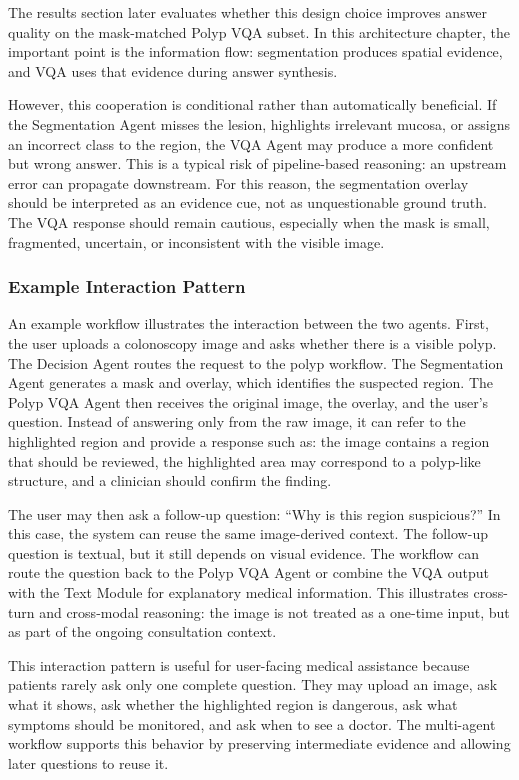 The results section later evaluates whether this design choice improves answer quality on the mask-matched Polyp VQA subset. In this architecture chapter, the important point is the information flow: segmentation produces spatial evidence, and VQA uses that evidence during answer synthesis.

However, this cooperation is conditional rather than automatically beneficial. If the Segmentation Agent misses the lesion, highlights irrelevant mucosa, or assigns an incorrect class to the region, the VQA Agent may produce a more confident but wrong answer. This is a typical risk of pipeline-based reasoning: an upstream error can propagate downstream. For this reason, the segmentation overlay should be interpreted as an evidence cue, not as unquestionable ground truth. The VQA response should remain cautious, especially when the mask is small, fragmented, uncertain, or inconsistent with the visible image.

\subsubsection{Example Interaction Pattern}

An example workflow illustrates the interaction between the two agents. First, the user uploads a colonoscopy image and asks whether there is a visible polyp. The Decision Agent routes the request to the polyp workflow. The Segmentation Agent generates a mask and overlay, which identifies the suspected region. The Polyp VQA Agent then receives the original image, the overlay, and the user's question. Instead of answering only from the raw image, it can refer to the highlighted region and provide a response such as: the image contains a region that should be reviewed, the highlighted area may correspond to a polyp-like structure, and a clinician should confirm the finding.

The user may then ask a follow-up question: ``Why is this region suspicious?'' In this case, the system can reuse the same image-derived context. The follow-up question is textual, but it still depends on visual evidence. The workflow can route the question back to the Polyp VQA Agent or combine the VQA output with the Text Module for explanatory medical information. This illustrates cross-turn and cross-modal reasoning: the image is not treated as a one-time input, but as part of the ongoing consultation context.

This interaction pattern is useful for user-facing medical assistance because patients rarely ask only one complete question. They may upload an image, ask what it shows, ask whether the highlighted region is dangerous, ask what symptoms should be monitored, and ask when to see a doctor. The multi-agent workflow supports this behavior by preserving intermediate evidence and allowing later questions to reuse it.

